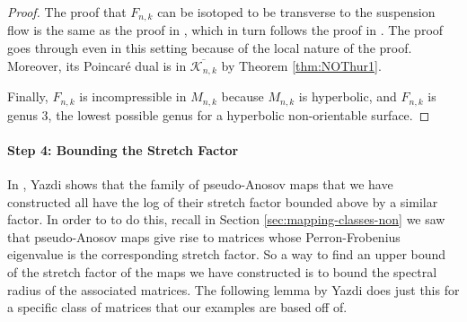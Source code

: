 \begin{proof}
  The proof that $F_{n,k}$ can be isotoped to be transverse to the suspension flow is the same as the
  proof in \cite{yazdi2018pseudo}, which in turn follows the proof in \cite{leininger2013number}. The proof goes
  through even in this setting %
  because of the local nature of the proof. Moreover, its Poincar\'e dual is in $\overline{\mathcal{K}_{n,k}}$ by Theorem \ref{thm:NOThur1}.

  Finally, $F_{n,k}$ is incompressible in $M_{n,k}$ because $M_{n,k}$ is hyperbolic, and $F_{n,k}$ is genus $3$, the
  lowest possible genus for a hyperbolic non-orientable surface.
\end{proof}

\paragraph{Step 4: Bounding the Stretch Factor}

In \cite{yazdi2018pseudo}, Yazdi shows that the family of pseudo-Anosov maps that we have constructed all have
the log of their stretch factor bounded above by a similar factor. In order to to do this, recall in Section
\ref{sec:mapping-classes-non} we saw that pseudo-Anosov maps give rise to matrices whose Perron-Frobenius eigenvalue is
the corresponding stretch factor. So a way to find an upper bound of the stretch factor of the maps we have constructed is
to bound the spectral radius of the associated matrices. The following lemma by Yazdi does just this for a
specific class of matrices that our examples are based off of.

